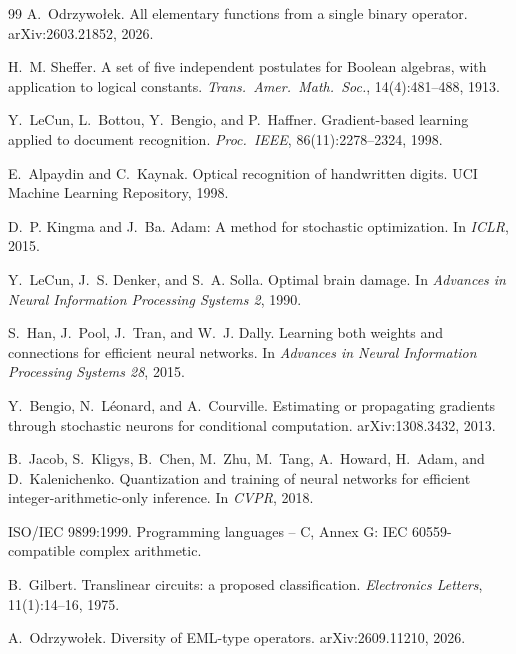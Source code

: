 \documentclass[11pt]{article}
\begin{document}
\begin{thebibliography}{99}\small
{}
A.~Odrzywołek.
\newblock All elementary functions from a single binary operator.
\newblock arXiv:2603.21852, 2026.

H.~M. Sheffer.
\newblock A set of five independent postulates for Boolean algebras, with
  application to logical constants.
\newblock \emph{Trans.\ Amer.\ Math.\ Soc.}, 14(4):481--488, 1913.

Y.~LeCun, L.~Bottou, Y.~Bengio, and P.~Haffner.
\newblock Gradient-based learning applied to document recognition.
\newblock \emph{Proc.\ IEEE}, 86(11):2278--2324, 1998.

E.~Alpaydin and C.~Kaynak.
\newblock Optical recognition of handwritten digits.
\newblock UCI Machine Learning Repository, 1998.

D.~P. Kingma and J.~Ba.
\newblock Adam: A method for stochastic optimization.
\newblock In \emph{ICLR}, 2015.

Y.~LeCun, J.~S. Denker, and S.~A. Solla.
\newblock Optimal brain damage.
\newblock In \emph{Advances in Neural Information Processing Systems 2}, 1990.

S.~Han, J.~Pool, J.~Tran, and W.~J. Dally.
\newblock Learning both weights and connections for efficient neural
  networks.
\newblock In \emph{Advances in Neural Information Processing Systems 28}, 2015.

Y.~Bengio, N.~L\'eonard, and A.~Courville.
\newblock Estimating or propagating gradients through stochastic neurons for
  conditional computation.
\newblock arXiv:1308.3432, 2013.

B.~Jacob, S.~Kligys, B.~Chen, M.~Zhu, M.~Tang, A.~Howard, H.~Adam, and
  D.~Kalenichenko.
\newblock Quantization and training of neural networks for efficient
  integer-arithmetic-only inference.
\newblock In \emph{CVPR}, 2018.

ISO/IEC 9899:1999.
\newblock Programming languages -- C, Annex G: IEC 60559-compatible complex
  arithmetic.

B.~Gilbert.
\newblock Translinear circuits: a proposed classification.
\newblock \emph{Electronics Letters}, 11(1):14--16, 1975.

A.~Odrzywołek.
\newblock Diversity of EML-type operators.
\newblock arXiv:2609.11210, 2026.


\end{thebibliography}
\end{document}
